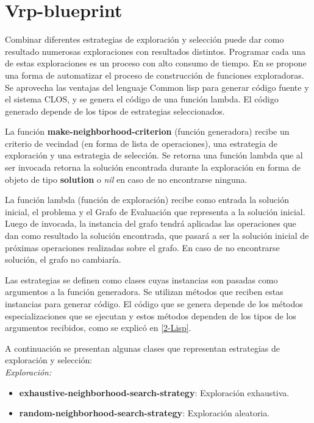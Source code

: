 \section{Vrp-blueprint}\label{2-blueprint}
Combinar diferentes estrategias de exploración y selección puede dar como resultado numerosas exploraciones con resultados distintos. Programar cada una de estas exploraciones es un proceso con alto consumo de tiempo. En \cite{Heidy} se propone una forma de automatizar el proceso de construcción de funciones exploradoras. Se aprovecha las ventajas del lenguaje Common lisp para generar código fuente y  el sistema CLOS, y se genera el código de una función lambda. El código generado depende de los tipos de estrategias seleccionados.

La función \textbf{make-neighborhood-criterion} (función generadora) recibe un criterio de vecindad (en forma de lista de operaciones), una estrategia de exploración y una estrategia de selección. Se retorna una función lambda que al ser invocada retorna la solución encontrada durante la exploración en forma de objeto de tipo \textbf{solution} o \textit{nil} en caso de no encontrarse ninguna.

La función lambda (función de exploración) recibe como entrada la solución inicial, el problema y el Grafo de Evaluación que representa a la solución inicial. Luego de invocada, la instancia del grafo tendrá aplicadas las operaciones que dan como resultado la solución encontrada, que pasará a ser la solución inicial de próximas operaciones realizadas sobre el grafo. En caso de no encontrarse solución, el grafo no cambiaría.

Las estrategias se definen como clases cuyas instancias son pasadas como argumentos a la función generadora. Se utilizan métodos que reciben estas instancias para generar código. El código que se genera depende de los métodos especializaciones que se ejecutan y estos métodos dependen de los tipos de los argumentos recibidos, como se explicó en \ref{2-Lisp}.

A continuación se presentan algunas clases que representan estrategias de exploración y selección:\\

\textit{Exploración:}
\begin{itemize}
	\item \textbf{exhaustive-neighborhood-search-strategy}: Exploración exhaustiva.
	\item \textbf{random-neighborhood-search-strategy}: Exploración aleatoria.
\end{itemize}

